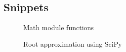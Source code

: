   \subsection{Snippets}
  \vspace{2em}
    \begin{figure}[h!]
      \centering
      \caption{Math module functions}
      \label{fig:Library functions for math}
    \end{figure}

    \begin{figure}[h!]
      \centering
      \caption{Root approximation using SciPy}
      \label{fig:SciPy Root Approximation}
    \end{figure}

